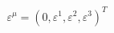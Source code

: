 \begin{equation}
\varepsilon^{\mu} = (0, \varepsilon^1, \varepsilon^2, \varepsilon^3)^T
\label{62}
\end{equation}

